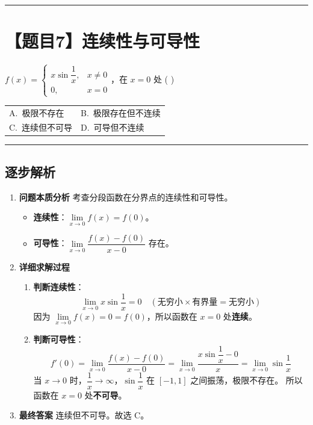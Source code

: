 \documentclass[UTF8,10pt]{ctexart}
\makeatletter
\newenvironment{redenv}{\color{red}}{}
\newenvironment{detailedanalysis}{%
    \color{red}
    \begin{enumerate}[label=\textbf{第\arabic*步：}, leftmargin=*, align=left, itemsep=0pt, parsep=0pt, topsep=0pt, partopsep=0pt]
}{%
    \end{enumerate}
}
\newcommand{\problemrule}{\par\filbreak\noindent\rule{\textwidth}{1.5pt}\vspace{-0.5em}}
\newcommand{\analysisrule}{\noindent\rule{\textwidth}{0.8pt}\vspace{-0.5em}}
\newcommand{\twochoices}[4]{
    \par\noindent
    \begin{tabular*}{\linewidth}{@{\extracolsep{\fill}}ll}
        A.~#1 & B.~#2 \\
        C.~#3 & D.~#4
    \end{tabular*}
}
\makeatother
\begin{document}
\problemrule
\section*{【题目7】连续性与可导性}
$f(x) = \begin{cases} x\sin\dfrac{1}{x}, & x \neq 0 \\ 0, & x=0 \end{cases}$，在 $x=0$ 处 ( \quad )
\twochoices{极限不存在}{极限存在但不连续}{连续但不可导}{可导但不连续}

\begin{redenv}
\analysisrule
\subsection*{逐步解析}

\begin{detailedanalysis}
\item \textbf{问题本质分析}
考查分段函数在分界点的连续性和可导性。
\begin{itemize}
    \item \textbf{连续性}：$\lim\limits_{x\to 0} f(x) = f(0)$。
    \item \textbf{可导性}：$\lim\limits_{x\to 0} \dfrac{f(x)-f(0)}{x-0}$ 存在。
\end{itemize}

\item \textbf{详细求解过程}
\begin{enumerate}[label=(\alph*)]
    \item \textbf{判断连续性}：
    \[ \lim\limits_{x\to 0} x\sin\dfrac{1}{x} = 0 \quad (\text{无穷小} \times \text{有界量} = \text{无穷小}) \]
    因为 $\lim\limits_{x\to 0} f(x) = 0 = f(0)$，所以函数在 $x=0$ 处\textbf{连续}。
    \item \textbf{判断可导性}：
    \[ f'(0) = \lim\limits_{x\to 0} \dfrac{f(x)-f(0)}{x-0} = \lim\limits_{x\to 0} \dfrac{x\sin\dfrac{1}{x} - 0}{x} = \lim\limits_{x\to 0} \sin\dfrac{1}{x} \]
    当 $x \to 0$ 时，$\dfrac{1}{x} \to \infty$，$\sin\dfrac{1}{x}$ 在 $[-1, 1]$ 之间振荡，极限不存在。
    所以函数在 $x=0$ 处\textbf{不可导}。
\end{enumerate}

\item \textbf{最终答案}
连续但不可导。故选 C。
\end{detailedanalysis}


\end{redenv}
\end{document}
